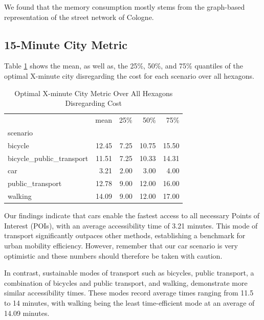 We found that the memory consumption mostly stems from the graph-based representation of the street network of Cologne.

\subsection{15-Minute City Metric}
\label{subsec:15_minute_city_metric}

Table \ref{tab:optimal_x_minute_city_metric} shows the mean, as well as, the 25\%, 50\%, and 75\% quantiles of the optimal X-minute city disregarding the cost for each scenario over all hexagons.

\begin{table}
  \caption{Optimal X-minute City Metric Over All Hexagons Disregarding Cost}
  \label{tab:optimal_x_minute_city_metric}
  \begin{center}
    \begin{tabular}{lrrrr}
       & mean & 25\% & 50\% & 75\% \\
      scenario &  &  &  &  \\
      bicycle & 12.45 & 7.25 & 10.75 & 15.50 \\
      bicycle\_public\_transport & 11.51 & 7.25 & 10.33 & 14.31 \\
      car & 3.21 & 2.00 & 3.00 & 4.00 \\
      public\_transport & 12.78 & 9.00 & 12.00 & 16.00 \\
      walking & 14.09 & 9.00 & 12.00 & 17.00 \\
    \end{tabular}
  \end{center}
\end{table}

Our findings indicate that cars enable the fastest access to all necessary Points of Interest (POIs), with an average accessibility time of 3.21 minutes. 
This mode of transport significantly outpaces other methods, establishing a benchmark for urban mobility efficiency.
However, remember that our car scenario is very optimistic and these numbers should therefore be taken with caution.

In contrast, sustainable modes of transport such as bicycles, public transport, a combination of bicycles and public transport, and walking, demonstrate more similar accessibility times. 
These modes record average times ranging from 11.5 to 14 minutes, with walking being the least time-efficient mode at an average of 14.09 minutes. 

